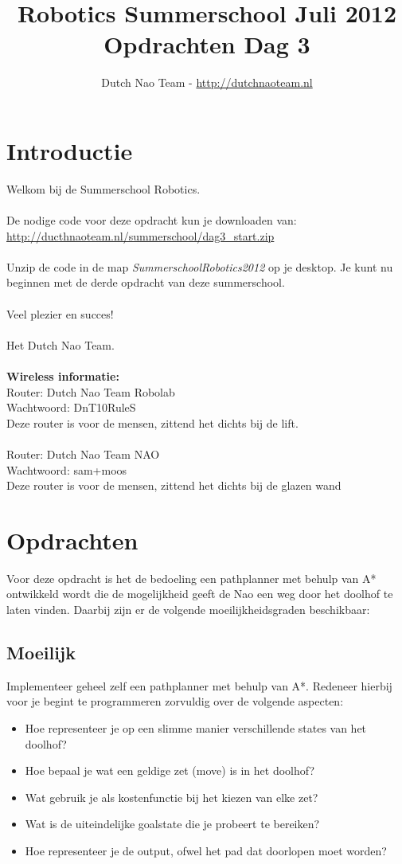 \documentclass[a4paper]{article}
\title{\textbf{Robotics Summerschool Juli 2012} \\ Opdrachten Dag 3}
\author{Dutch Nao Team - \url{http://dutchnaoteam.nl}}
\date{}
\begin{document}
\maketitle

\section{Introductie}
Welkom bij de Summerschool Robotics.\\
\\
De nodige code voor deze opdracht kun je downloaden van:\\ \url{http://ducthnaoteam.nl/summerschool/dag3\_start.zip}\\
\\
Unzip de code in de map \textit{SummerschoolRobotics2012} op je desktop. Je kunt nu beginnen met de derde opdracht van deze summerschool. \\
\\
Veel plezier en succes!\\
\\
Het Dutch Nao Team.\\
\\
\textbf{Wireless informatie:}\\
Router:  Dutch Nao Team Robolab\\
Wachtwoord: DnT10RuleS\\
Deze router is voor de mensen, zittend het dichts bij de lift.\\
\\
Router:  Dutch Nao Team NAO\\
Wachtwoord: sam+moos\\
Deze router is voor de mensen, zittend het dichts bij de glazen wand


\tableofcontents

\newpage


\section{Opdrachten}
Voor deze opdracht is het de bedoeling een pathplanner met behulp van A* ontwikkeld wordt die de mogelijkheid geeft de Nao een weg door het doolhof te laten vinden. Daarbij zijn er de volgende moeilijkheidsgraden beschikbaar:

\subsection{Moeilijk}
Implementeer geheel zelf een pathplanner met behulp van A*. Redeneer hierbij voor je begint te programmeren zorvuldig over de volgende aspecten:
\begin{itemize}
\item Hoe representeer je op een slimme manier verschillende states van het doolhof?
\item Hoe bepaal je wat een geldige zet (move) is in het doolhof?
\item Wat gebruik je als kostenfunctie bij het kiezen van elke zet?
\item Wat is de uiteindelijke goalstate die je probeert te bereiken?
\item Hoe representeer je de output, ofwel het pad dat doorlopen moet worden?
\end{itemize}
\end{document}
